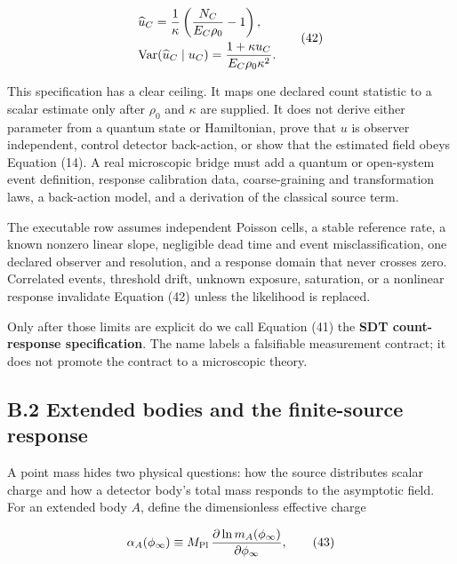 \documentclass[
  american,
  11pt,
  letterpaper,
]{article}
\begin{document}
\begin{equation}
\begin{aligned}
& \widehat u_C=\frac{1}{\kappa}
\left(\frac{N_C}{E_C\rho_0}-1\right), \\
& {\rm Var}(\widehat u_C\mid u_C)
=\frac{1+\kappa u_C}{E_C\rho_0\kappa^2}.
\end{aligned}
\tag{42}
\end{equation}

This specification has a clear ceiling. It maps one declared count statistic to a scalar estimate only after \(\rho_0\) and \(\kappa\) are supplied. It does not derive either parameter from a quantum state or Hamiltonian, prove that \(u\) is observer independent, control detector back-action, or show that the estimated field obeys Equation (14). A real microscopic bridge must add a quantum or open-system event definition, response calibration data, coarse-graining and transformation laws, a back-action model, and a derivation of the classical source term.

The executable row assumes independent Poisson cells, a stable reference rate, a known nonzero linear slope, negligible dead time and event misclassification, one declared observer and resolution, and a response domain that never crosses zero. Correlated events, threshold drift, unknown exposure, saturation, or a nonlinear response invalidate Equation (42) unless the likelihood is replaced.

Only after those limits are explicit do we call Equation (41) the \textbf{SDT count-response specification}. The name labels a falsifiable measurement contract; it does not promote the contract to a microscopic theory.

\subsection{B.2 Extended bodies and the finite-source response}\label{b.2-extended-bodies-and-the-finite-source-response}

A point mass hides two physical questions: how the source distributes scalar charge and how a detector body's total mass responds to the asymptotic field. For an extended body \(A\), define the dimensionless effective charge

\begin{equation}
\alpha_A(\phi_\infty)
\equiv M_{\rm Pl}\,
\frac{\partial\ln m_A(\phi_\infty)}{\partial\phi_\infty},
\tag{43}
\end{equation}
\end{document}
